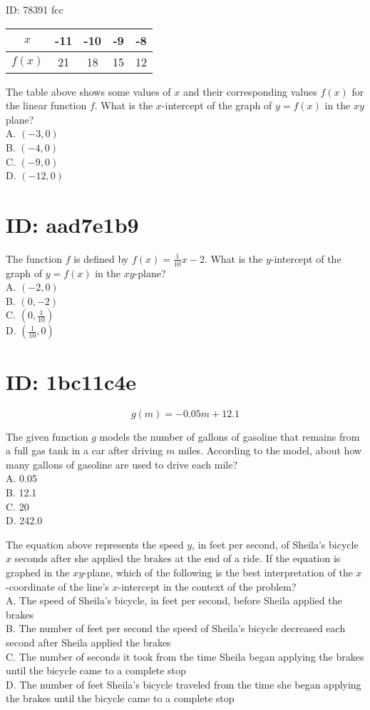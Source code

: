 ID: 78391 fcc

\begin{center}
\begin{tabular}{|c|c|c|c|c|}
\hline
$x$ & -11 & -10 & -9 & -8 \\
\hline
$f(x)$ & 21 & 18 & 15 & 12 \\
\hline
\end{tabular}
\end{center}

The table above shows some values of $x$ and their corresponding values $f(x)$ for the linear function $f$. What is the $x$-intercept of the graph of $y=f(x)$ in the $x y$ plane?\\
A. $(-3,0)$\\
B. $(-4,0)$\\
C. $(-9,0)$\\
D. $(-12,0)$

\section*{ID: aad7e1b9}
The function $f$ is defined by $f(x)=\frac{1}{10} x-2$. What is the $y$-intercept of the graph of $y=f(x)$ in the $x y$-plane?\\
A. $(-2,0)$\\
B. $(0,-2)$\\
C. $\left(0, \frac{1}{10}\right)$\\
D. $\left(\frac{1}{10}, 0\right)$

\section*{ID: 1bc11c4e}
$$
g(m)=-0.05 m+12.1
$$

The given function $g$ models the number of gallons of gasoline that remains from a full gas tank in a car after driving $m$ miles. According to the model, about how many gallons of gasoline are used to drive each mile?\\
A. 0.05\\
B. 12.1\\
C. 20\\
D. 242.0

The equation above represents the speed $y$, in feet per second, of Sheila's bicycle $x$ seconds after she applied the brakes at the end of a ride. If the equation is graphed in the $x y$-plane, which of the following is the best interpretation of the $x$-coordinate of the line's $x$-intercept in the context of the problem?\\
A. The speed of Sheila's bicycle, in feet per second, before Sheila applied the brakes\\
B. The number of feet per second the speed of Sheila's bicycle decreased each second after Sheila applied the brakes\\
C. The number of seconds it took from the time Sheila began applying the brakes until the bicycle came to a complete stop\\
D. The number of feet Sheila's bicycle traveled from the time she began applying the brakes until the bicycle came to a complete stop


